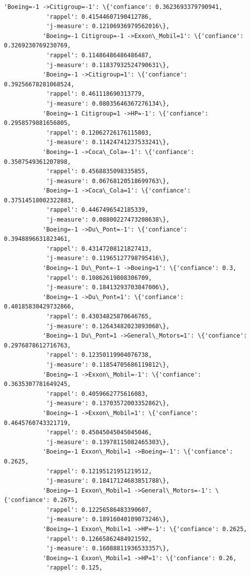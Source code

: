 \documentclass[11pt]{article}
\begin{document}
\begin{Verbatim}[commandchars=\\\{\}]
           'Boeing=-1 ->Citigroup=-1': \{'confiance': 0.3623693379790941,
            'rappel': 0.41544607190412786,
            'j-measure': 0.12106936979562016\},
           'Boeing=-1 Citigroup=-1 ->Exxon\_Mobil=1': \{'confiance': 0.3269230769230769,
            'rappel': 0.11486486486486487,
            'j-measure': 0.11837932524790631\},
           'Boeing=-1 ->Citigroup=1': \{'confiance': 0.39256678281068524,
            'rappel': 0.461118690313779,
            'j-measure': 0.08035646367276134\},
           'Boeing=-1 Citigroup=1 ->HP=-1': \{'confiance': 0.2958579881656805,
            'rappel': 0.12062726176115803,
            'j-measure': 0.11424741237533241\},
           'Boeing=-1 ->Coca\_Cola=-1': \{'confiance': 0.3507549361207898,
            'rappel': 0.4568835098335855,
            'j-measure': 0.06768120518699763\},
           'Boeing=-1 ->Coca\_Cola=1': \{'confiance': 0.37514518002322883,
            'rappel': 0.4467496542185339,
            'j-measure': 0.08800227473208638\},
           'Boeing=-1 ->Du\_Pont=-1': \{'confiance': 0.3948896631823461,
            'rappel': 0.43147208121827413,
            'j-measure': 0.11965127798795416\},
           'Boeing=-1 Du\_Pont=-1 ->Boeing=1': \{'confiance': 0.3,
            'rappel': 0.10862619808306709,
            'j-measure': 0.18413293703847006\},
           'Boeing=-1 ->Du\_Pont=1': \{'confiance': 0.40185830429732866,
            'rappel': 0.43034825870646765,
            'j-measure': 0.12643482023893068\},
           'Boeing=-1 Du\_Pont=1 ->General\_Motors=1': \{'confiance': 0.2976878612716763,
            'rappel': 0.12350119904076738,
            'j-measure': 0.11854705686119812\},
           'Boeing=-1 ->Exxon\_Mobil=-1': \{'confiance': 0.3635307781649245,
            'rappel': 0.4059662775616083,
            'j-measure': 0.13703572003352862\},
           'Boeing=-1 ->Exxon\_Mobil=1': \{'confiance': 0.4645760743321719,
            'rappel': 0.45045045045045046,
            'j-measure': 0.13978115082465303\},
           'Boeing=-1 Exxon\_Mobil=1 ->Boeing=-1': \{'confiance': 0.2625,
            'rappel': 0.12195121951219512,
            'j-measure': 0.18417124683851788\},
           'Boeing=-1 Exxon\_Mobil=1 ->General\_Motors=-1': \{'confiance': 0.2675,
            'rappel': 0.12256586483390607,
            'j-measure': 0.18916040109073246\},
           'Boeing=-1 Exxon\_Mobil=1 ->HP=-1': \{'confiance': 0.2625,
            'rappel': 0.12665862484921592,
            'j-measure': 0.16088811936533357\},
           'Boeing=-1 Exxon\_Mobil=1 ->HP=1': \{'confiance': 0.26,
            'rappel': 0.125,

\end{Verbatim}
\end{document}
